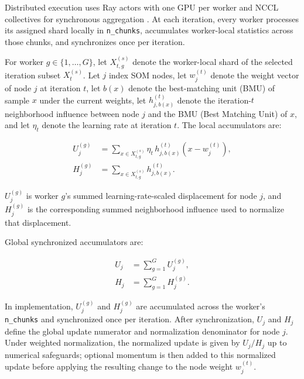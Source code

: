 \documentclass[10pt]{article} %
\begin{document}
Distributed execution uses Ray actors with one GPU per worker and NCCL collectives for synchronous aggregation \citep{moritzRayDistributedFramework2018}. At each iteration, every worker processes its assigned shard locally in \texttt{n\_chunks}, accumulates worker-local statistics across those chunks, and synchronizes once per iteration.

For worker $g \in \{1,\dots,G\}$, let $X_{t,g}^{(s)}$ denote the worker-local shard of the selected iteration subset $X_t^{(s)}$. Let $j$ index SOM nodes, let $w_j^{(t)}$ denote the weight vector of node $j$ at iteration $t$, let $b(x)$ denote the best-matching unit (BMU) of sample $x$ under the current weights, let $h_{j,b(x)}^{(t)}$ denote the iteration-$t$ neighborhood influence between node $j$ and the BMU (Best Matching Unit) of $x$, and let $\eta_t$ denote the learning rate at iteration $t$. The local accumulators are:

\begin{equation*}
\begin{aligned}
 U_j^{(g)} &= \sum_{x \in X_{t,g}^{(s)}} \eta_t\,h_{j,b(x)}^{(t)}(x-w_j^{(t)}), \\
 H_j^{(g)} &= \sum_{x \in X_{t,g}^{(s)}} h_{j,b(x)}^{(t)}.
\end{aligned}
\tag{3}
\end{equation*}

$U_j^{(g)}$ is worker $g$'s summed learning-rate-scaled displacement for node $j$, and $H_j^{(g)}$ is the corresponding summed neighborhood influence used to normalize that displacement.

Global synchronized accumulators are:

\begin{equation*}
\begin{aligned}
U_j &= \sum_{g=1}^{G} U_j^{(g)}, \\
H_j &= \sum_{g=1}^{G} H_j^{(g)}.
\end{aligned}
\tag{4}
\end{equation*}

In implementation, $U_j^{(g)}$ and $H_j^{(g)}$ are accumulated across the worker's \texttt{n\_chunks} and synchronized once per iteration. After synchronization, $U_j$ and $H_j$ define the global update numerator and normalization denominator for node $j$. Under weighted normalization, the normalized update is given by $U_j/H_j$ up to numerical safeguards; optional momentum is then added to this normalized update before applying the resulting change to the node weight $w_j^{(t)}$.
\end{document}
